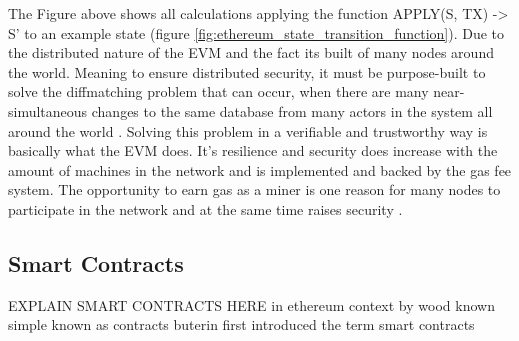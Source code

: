 The Figure above shows all calculations applying the function APPLY(S, TX) -> S' to an example state (figure \ref{fig:ethereum_state_transition_function}). Due to the distributed nature of the \ac{EVM} and the fact its built of many nodes around the world. Meaning to ensure distributed security, it must be purpose-built to solve the diffmatching problem that can occur, when there are many near-simultaneous changes to the same database from many actors in the system all around the world . Solving this problem in a verifiable and trustworthy way is basically what the \ac{EVM} does. It's resilience and security does increase with the amount of machines in the network and is implemented and backed by the gas fee system. The opportunity to earn gas as a miner is one reason for many nodes to participate in the network and at the same time raises security \cite{dannen2017introducing}.



 
\clearpage


\subsection{Smart Contracts}
\label{subsec:background:first_section:first_subsection}
EXPLAIN SMART CONTRACTS HERE 
in ethereum context by wood known simple known as contracts
buterin first introduced the term smart contracts
\cite{buterin2013ethereum}
\cite{wood2014ethereum}
\cite{dannen2017introducing}





